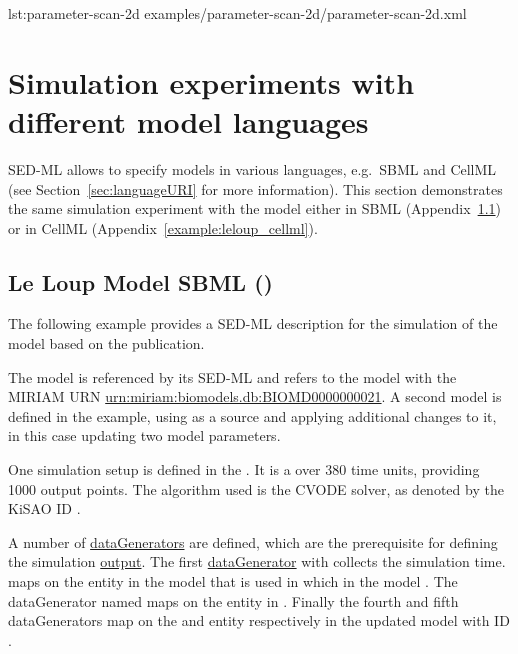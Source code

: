 {lst:parameter-scan-2d}
{examples/parameter-scan-2d/parameter-scan-2d.xml}


\section{Simulation experiments with different model languages}
SED-ML allows to specify models in various languages, e.g.\ SBML and CellML (see Section~\ref{sec:languageURI} for more information). This section demonstrates the same simulation experiment with the model either in SBML (Appendix~\ref{example:leloup_sbml}) or in CellML (Appendix~\ref{example:leloup_cellml}).

\subsection{Le Loup Model SBML ()}
\label{example:leloup_sbml}
The following example provides a SED-ML description for the simulation of the model based on the publication\cite{LeLoup1999}.

The model is referenced by its SED-ML \hyperref[sec:id]{}  and refers to the model with the MIRIAM URN \url{urn:miriam:biomodels.db:BIOMD0000000021}. A second model is defined in the example, using  as a source and applying additional changes to it, in this case updating two model parameters.

One simulation setup is defined in the . It is a  over 380 time units, providing 1000 output points. The algorithm used is the CVODE solver, as denoted by the KiSAO ID .

A number of \hyperref[class:dataGenerator]{dataGenerators} are defined, which are the prerequisite for defining the simulation \hyperref[class:output]{output}. The first \hyperref[class:dataGenerator]{dataGenerator} with \hyperref[sec:id]{}  collects the simulation time.  maps on the  entity in the model that is used in  which in the model . The dataGenerator named  maps on the  entity in . Finally  the fourth and fifth dataGenerators map on the  and  entity respectively in the updated model with ID .

